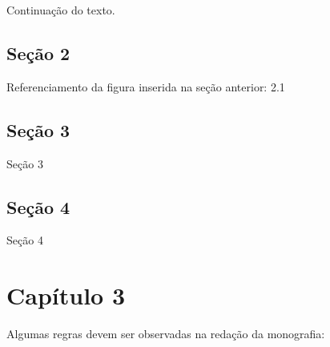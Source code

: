 \documentclass[
	12pt,			%
	openright,		%
	oneside,	
	a4paper,		%
	english,		%
	brazil			%
]{abntex2/abntex2}  %
\begin{document}
		Continuação do texto.
		
	\section{Seção 2}
	
		Referenciamento da figura inserida na seção anterior: 2.1
		
	\section{Seção 3}
	
		Seção 3
		
	\section{Seção 4}
	
		Seção 4

\chapter{Capítulo 3}

	Algumas regras devem ser observadas na redação da monografia:
\end{document}
